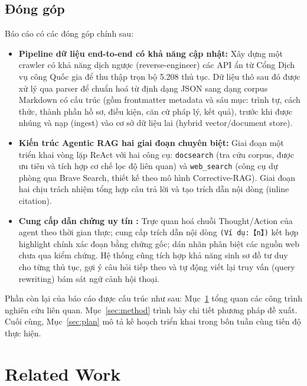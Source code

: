 \documentclass[11pt]{article}
\begin{document}
\subsection{Đóng góp}

Báo cáo có các đóng góp chính sau:
\begin{itemize}
  \item \textbf{Pipeline dữ liệu end-to-end có khả năng cập nhật: } Xây dựng một crawler có khả năng dịch ngược (reverse-engineer) các API ẩn từ Cổng Dịch vụ công Quốc gia để thu thập trọn bộ 5.208 thủ tục. Dữ liệu thô sau đó được xử lý qua parser để chuẩn hoá từ định dạng JSON sang dạng corpus Markdown có cấu trúc (gồm frontmatter metadata và sáu mục: trình tự, cách thức, thành phần hồ sơ, điều kiện, căn cứ pháp lý, kết quả), trước khi được nhúng và nạp (ingest) vào cơ sở dữ liệu lai (hybrid vector/document store).
  \item \textbf{Kiến trúc Agentic RAG hai giai đoạn chuyên biệt: } Giai đoạn một triển khai vòng lặp ReAct với hai công cụ: \texttt{docsearch} (tra cứu corpus, được ưu tiên và tích hợp cơ chế lọc độ liên quan) và \texttt{web\_search} (công cụ dự phòng qua Brave Search, thiết kế theo mô hình Corrective-RAG). Giai đoạn hai chịu trách nhiệm tổng hợp câu trả lời và tạo trích dẫn nội dòng (inline citation).
  \item \textbf{Cung cấp dẫn chứng uy tín
  : } Trực quan hoá chuỗi Thought/Action của agent theo thời gian thực; cung cấp trích dẫn nội dòng \texttt{(Ví dụ:【n】)} kết hợp highlight chính xác đoạn bằng chứng gốc; dán nhãn phân biệt các nguồn web chưa qua kiểm chứng. Hệ thống cũng tích hợp khả năng sinh sơ đồ tư duy cho từng thủ tục, gợi ý câu hỏi tiếp theo và tự động viết lại truy vấn (query rewriting) bám sát ngữ cảnh hội thoại.
\end{itemize}

Phần còn lại của báo cáo được cấu trúc như sau: Mục~\ref{sec:related} tổng quan các công trình nghiên cứu liên quan. Mục~\ref{sec:method} trình bày chi tiết phương pháp đề xuất. Cuối cùng, Mục~\ref{sec:plan} mô tả kế hoạch triển khai trong bốn tuần cùng tiến độ thực hiện.

\section{Related Work}
\label{sec:related}
\end{document}
